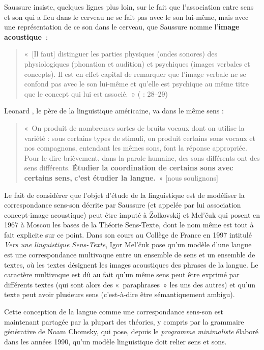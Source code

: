 {    Saussure insiste, quelques lignes plus loin, sur le fait que l’association entre sens et son qui a lieu dans le cerveau ne se fait pas avec le son lui-même, mais avec une représentation de ce son dans le cerveau, que Saussure nomme l’\textbf{image acoustique~}:

    \begin{quote}
    «~[Il faut] distinguer les parties physiques (ondes sonores) des physiologiques (phonation et audition) et psychiques (images verbales et concepts). Il est en effet capital de remarquer que l’image verbale ne se confond pas avec le son lui-même et qu’elle est psychique au même titre que le concept qui lui est associé.~» (\citealt{saussure1916cours} : 28--29)
    \end{quote}

    Leonard \citet[27]{bloomfield1933language}, le père de la linguistique américaine, va dans le même sens :

    \begin{quote}
    «~On produit de nombreuses sortes de bruits vocaux dont on utilise la variété : sous certains types de stimuli, on produit certains sons vocaux et nos compagnons, entendant les mêmes sons, font la réponse appropriée. Pour le dire brièvement, dans la parole humaine, des sons différents ont des sens différents. \textbf{Étudier} \textbf{la coordination de certains sons avec certains sens,} \textbf{c’est} \textbf{étudier la langue.}~» [nous soulignons]
    \end{quote}

    Le fait de considérer que l’objet d’étude de la linguistique est de modéliser la correspondance sens-son décrite par Saussure (et appelée par lui association concept-image acoustique) peut être imputé à Žolkovskij et Mel’čuk qui posent en 1967 à Moscou les bases de la Théorie Sens-Texte, dont le nom même est tout à fait explicite sur ce point. Dans son cours au Collège de France en 1997 intitulé \textit{Vers une linguistique Sens-Texte}, Igor Mel’čuk pose qu’un modèle d’une langue est une correspondance multivoque entre un ensemble de sens et un ensemble de textes, où les textes désignent les images acoustiques des phrases de la langue. Le caractère multivoque est dû au fait qu’un même sens peut être exprimé par différents textes (qui sont alors des «~paraphrases~» les uns des autres) et qu’un texte peut avoir plusieurs sens (c’est-à-dire être sémantiquement ambigu).

    Cette conception de la langue comme une correspondance sens-son est maintenant partagée par la plupart des théories, y compris par la grammaire générative de Noam Chomsky, qui pose, depuis le \textit{programme minimaliste} élaboré dans les années 1990, qu’un modèle linguistique doit relier sens et sons.
}
